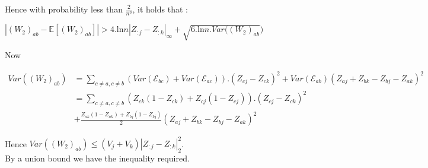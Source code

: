 Hence with probability less than $\frac{2}{n^3}$, it holds that :

\begin{center}
$|(W_2)_{ab} - \mathbb{E}[(W_2)_{ab}]| > 4.\mbox{ln}n|Z_{:j} - Z_{:k}|_{\infty} + \sqrt{6.\mbox{ln}n.Var((W_2)_{ab}})$\\
\end{center}
Now  
\begin{center}
\begin{align*}
Var((W_2)_{ab}) &= \sum_{c \neq a, c\neq b} (Var(\mathcal{E}_{bc}) + Var(\mathcal{E}_{ac})).(Z_{cj} - Z_{ck})^2 + Var(\mathcal{E}_{ab})(Z_{aj} + Z_{bk} - Z_{bj} - Z_{ak})^2\\&=\sum_{c \neq a, c\neq b} (Z_{ck}(1-Z_{ck}) + Z_{cj}(1-Z_{cj})).(Z_{cj} - Z_{ck})^2 \\ &+ \frac{Z_{ak}(1-Z_{ak})+Z_{bj}(1-Z_{bj})}{2}(Z_{aj} + Z_{bk} - Z_{bj} - Z_{ak})^2 
\end{align*}
\end{center}
Hence $Var((W_2)_{ab}) \le (V_j+V_k)|Z_{:j} - Z_{:k}|_2^2$.
\\
By a union bound we have the inequality required.\\